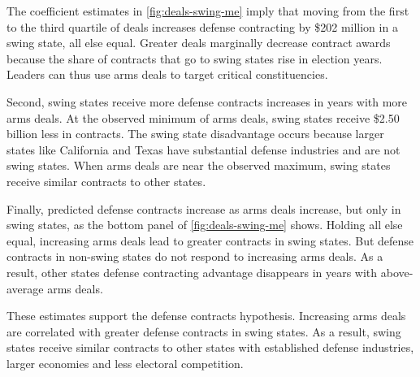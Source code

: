 \documentclass[12pt]{article}
\begin{document}
The coefficient estimates in \autoref{fig:deals-swing-me} imply that moving from the first to the third quartile of deals increases defense contracting by \$202 million in a swing state, all else equal. 
Greater deals marginally decrease contract awards because the share of contracts that go to swing states rise in election years. 
Leaders can thus use arms deals to target critical constituencies.


Second, swing states receive more defense contracts increases in years with more arms deals. 
At the observed minimum of arms deals, swing states receive \$2.50 billion less in contracts.
The swing state disadvantage occurs because larger states like California and Texas have substantial defense industries and are not swing states.
When arms deals are near the observed maximum, swing states receive similar contracts to other states. 


Finally, predicted defense contracts increase as arms deals increase, but only in swing states, as the bottom panel of \autoref{fig:deals-swing-me} shows. 
Holding all else equal, increasing arms deals lead to greater contracts in swing states. 
But defense contracts in non-swing states do not respond to increasing arms deals.
As a result, other states defense contracting advantage disappears in years with above-average arms deals. 



These estimates support the defense contracts hypothesis. 
Increasing arms deals are correlated with greater defense contracts in swing states. 
As a result, swing states receive similar contracts to other states with established defense industries, larger economies and less electoral competition. 
%
%
%
%
\end{document}
